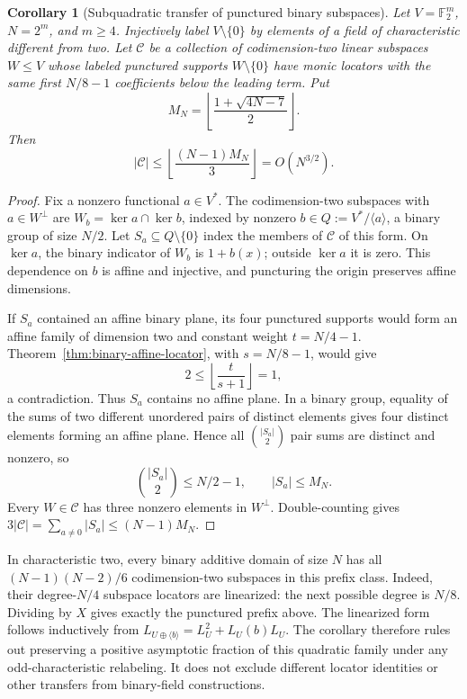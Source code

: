 \documentclass[11pt,letterpaper]{article}
\newtheorem{corollary}[theorem]{Corollary}
\theoremstyle{definition}
\theoremstyle{remark}
\begin{document}
\begin{corollary}[Subquadratic transfer of punctured binary subspaces]
\label{cor:codimension-two-transfer}
Let $V=\mathbb F_2^m$, $N=2^m$, and $m\ge4$. Injectively label
$V\setminus\{0\}$ by elements of a field of characteristic different
from two. Let $\mathcal C$ be a collection of codimension-two linear
subspaces $W\le V$ whose labeled punctured supports $W\setminus\{0\}$
have monic locators with the same first $N/8-1$ coefficients below
the leading term. Put
\[
 M_N=\left\lfloor\frac{1+\sqrt{4N-7}}2\right\rfloor.
\]
Then
\[
 |\mathcal C|\le\left\lfloor\frac{(N-1)M_N}{3}\right\rfloor
 =O(N^{3/2}).
\]
\end{corollary}
\begin{proof}
Fix a nonzero functional $a\in V^*$. The codimension-two subspaces
with $a\in W^\perp$ are $W_b=\ker a\cap\ker b$, indexed by nonzero
$b\in Q:=V^*/\langle a\rangle$, a binary group of size $N/2$.
Let $S_a\subseteq Q\setminus\{0\}$ index the members of $\mathcal C$
of this form. On $\ker a$, the binary indicator of $W_b$ is $1+b(x)$;
outside $\ker a$ it is zero. This dependence on $b$ is affine and
injective, and puncturing the origin preserves affine dimensions.

If $S_a$ contained an affine binary plane, its four punctured supports
would form an affine family of dimension two and constant weight
$t=N/4-1$. Theorem~\ref{thm:binary-affine-locator}, with
$s=N/8-1$, would give
\[
 2\le\left\lfloor\frac{t}{s+1}\right\rfloor=1,
\]
a contradiction. Thus $S_a$ contains no affine plane. In a binary
group, equality of the sums of two different unordered pairs of
distinct elements gives four distinct elements forming an affine
plane. Hence all $\binom{|S_a|}{2}$ pair sums are distinct and nonzero,
so
\[
 \binom{|S_a|}{2}\le N/2-1,\qquad |S_a|\le M_N.
\]
Every $W\in\mathcal C$ has three nonzero elements in $W^\perp$.
Double-counting gives $3|\mathcal C|=\sum_{a\ne0}|S_a|\le(N-1)M_N$.
\end{proof}

In characteristic two, every binary additive domain of size $N$
has all $(N-1)(N-2)/6$ codimension-two subspaces in this prefix
class. Indeed, their degree-$N/4$ subspace locators are linearized:
the next possible degree is $N/8$. Dividing by $X$ gives exactly the
punctured prefix above. The linearized form follows inductively from
$L_{U\oplus\langle b\rangle}=L_U^2+L_U(b)L_U$.
The corollary therefore rules out preserving a positive asymptotic
fraction of this quadratic family under any odd-characteristic
relabeling. It does not exclude different locator identities or
other transfers from binary-field constructions.
\end{document}
